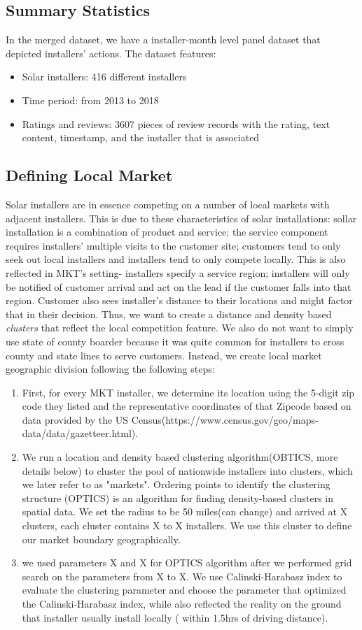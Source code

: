 \documentclass[mnsc,blindrev]{informs3} %
\begin{document}
\subsection{Summary Statistics}
In the merged dataset, we have a installer-month level panel dataset that depicted installers' actions. The dataset features: 
\begin{itemize}
\item Solar installers: 416 different installers
\item Time period: from 2013 to 2018
\item Ratings and reviews: 3607 pieces of review records with the rating, text content, timestamp, and the installer that is associated  
\end{itemize}
\subsection{Defining Local Market} 
Solar installers are in essence competing on a number of local markets with adjacent installers.  This is due to these characteristics of solar installations: sollar installation is a combination of product and service; the service component requires installers' multiple visits to the customer site;  customers tend to only seek out local installers and installers tend to only compete locally. This is also reflected in MKT's setting- installers specify a service region; installers will only be notified of customer arrival and act on the lead if the customer falls into that region. Customer also sees installer's distance to their locations and might factor that in their decision. Thus, we want to create a distance and density based \textit{clusters} that reflect the local competition feature. 
We also do not want to simply use state of county boarder because it was quite common for installers to cross county and state lines to serve customers. Instead, we create local market geographic division following the following steps: 
\begin{enumerate}
	\item First, for every MKT installer, we determine its location using the 5-digit zip code they listed and the representative coordinates of that Zipcode based on data provided by the US Census(https://www.census.gov/geo/maps-data/data/gazetteer.html). 
	\item  We run a location and density based clustering algorithm(OBTICS, more details below) to cluster the pool of nationwide installers into clusters, which we later refer to as "markets".  Ordering points to identify the clustering structure (OPTICS) is an algorithm for finding density-based clusters in spatial data.  We set the radius to be 50 miles(can change) and arrived at X clusters, each cluster contains X to X installers. We use this cluster to define our market boundary geographically.   
	\item we used parameters X and X for OPTICS algorithm after we performed grid search on the parameters from X to X. We use Calinski-Harabasz index to evaluate the clustering parameter and choose the parameter that optimized the Calinski-Harabasz index, while also reflected the reality on the ground that installer usually install locally ( within 1.5hrs of driving distance).
\end{enumerate}
\end{document}
